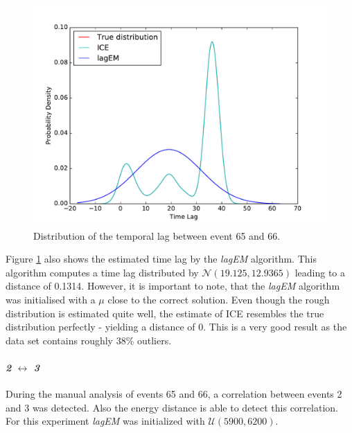\documentclass[conference]{IEEEtran}
\theoremstyle{examplestyle}
\begin{document}
\begin{figure}[!htb]
	\centering
	\includegraphics[scale=0.4]{images/symantec/66-65.pdf}
	\caption{Distribution of the temporal lag between event 65 and 66.}
	\label{fig:66-65}
\end{figure}

Figure \ref{fig:66-65} also shows the estimated time lag by the \textit{lagEM} algorithm. This algorithm computes a time lag distributed by \(\mathcal{N}(19.125, 12.9365)\) leading to a distance of 0.1314. However, it is important to note, that the \textit{lagEM} algorithm was initialised with a \(\mu\) close to the correct solution. Even though the rough distribution is estimated quite well, the estimate of \ac{ICE} resembles the true distribution perfectly - yielding a distance of 0. This is a very good result as the data set contains roughly 38\% outliers.



\paragraph{\textit{2} \(\leftrightarrow\) \textit{3}} During the manual analysis of events 65 and 66, a correlation between events 2 and 3 was detected. Also the energy distance is able to detect this correlation. For this experiment \textit{lagEM} was initialized with \(\mathcal{U}(5900, 6200)\).
\end{document}
